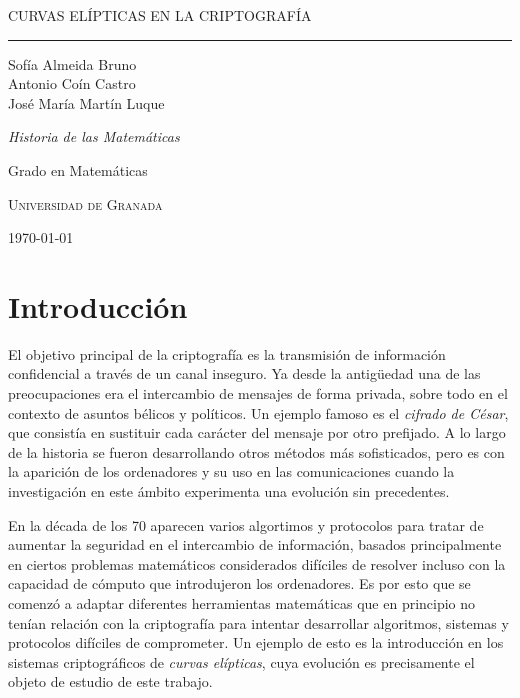 \documentclass[
  a4paper,
  12pt,
  spanish,
]{scrartcl}
\DeclareRobustCommand{\spacedallcaps}[1]{{\linespread{1.3}\sacshape\MakeTextUppercase{#1}}}%
\newcommand{\horrule}[1]{\rule{\linewidth}{#1}}
\begin{document}
\begin{titlepage}
  \vspace*{4cm}

  \begin{flushleft}
    \Huge
    \spacedallcaps{Curvas Elípticas en la Criptografía}
    \horrule{2pt}
  \end{flushleft}

  \vspace{2em}

  \begin{flushright}
    \large
    Sofía Almeida Bruno\\
    Antonio Coín Castro\\
    José María Martín Luque\vspace{1em}

    \textit{Historia de las Matemáticas}

    Grado en Matemáticas

    \textsc{Universidad de Granada}\vspace{1em}

    \today\vspace{.5em}
  \end{flushright}
\end{titlepage}

\newpage

{\hypersetup{hidelinks}
\tableofcontents
}

\newpage

\section{Introducción}

El objetivo principal de la criptografía es la transmisión de información confidencial a través de un canal inseguro. Ya desde la antigüedad una de las preocupaciones era el intercambio de mensajes de forma privada, sobre todo en el contexto de asuntos bélicos y políticos. Un ejemplo famoso es el \textit{cifrado de César}, que consistía en sustituir cada carácter del mensaje por otro prefijado. A lo largo de la historia se fueron desarrollando otros métodos más sofisticados, pero es con la aparición de los ordenadores y su uso en las comunicaciones cuando la investigación en este ámbito experimenta una evolución sin precedentes.

En la década de los 70 aparecen varios algortimos y protocolos para tratar de aumentar la seguridad en el intercambio de información, basados principalmente en ciertos problemas matemáticos considerados difíciles de resolver incluso con la capacidad de cómputo que introdujeron los ordenadores. Es por esto que se comenzó a adaptar diferentes herramientas matemáticas que en principio no tenían relación con la criptografía para intentar desarrollar algoritmos, sistemas y protocolos difíciles de comprometer. Un ejemplo de esto es la introducción en los sistemas criptográficos de \textit{curvas elípticas}, cuya evolución es precisamente el objeto de estudio de este trabajo.
\end{document}
